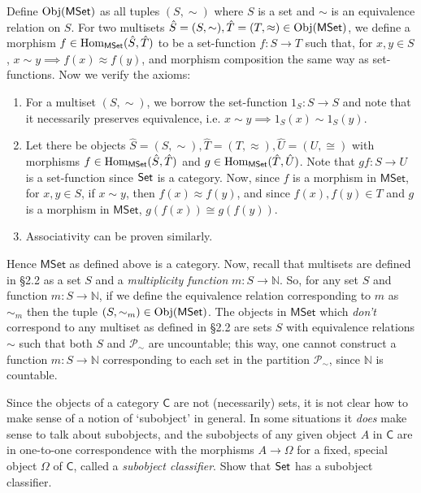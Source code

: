 \begin{solution}
	Define $\mathrm{Obj}(\mathsf{MSet})$ as all tuples $(S, \sim)$ where $S$ is a set and $\sim$ is
	an equivalence relation on $S$. For two multisets $\hat{S} = (S,\sim), \hat{T} =
	(T,\approx) \in \mathrm{Obj}(\mathsf{MSet})$, we define a morphism
	$f\in\mathrm{Hom}_{\mathsf{MSet}}(\hat{S},\hat{T})$ to be a set-function $f:S\to T$ such that, for
	$x,y\in S$, $x\sim y\implies f(x)\approx f(y)$, and morphism composition the
	same way as set-functions. Now we verify the axioms:
	
	\begin{enumerate}
		\item For a multiset $(S,\sim)$, we borrow the set-function $1_S:S\to S$ and
		note that it necessarily preserves equivalence, i.e. $x\sim y\implies 1_S(x)\sim
		1_S(y)$.
		\item Let there be objects $\hat{S}=(S,\sim), \hat{T}=(T,\approx),
		\hat{U}=(U,\cong)$ with morphisms $f\in\mathrm{Hom}_{\mathsf{MSet}}(\hat{S},\hat{T})$ and
		$g\in\mathrm{Hom}_{\mathsf{MSet}}(\hat{T},\hat{U})$. Note that $gf:S\to U$ is a set-function since
		$\mathsf{Set}$ is a category. Now, since $f$ is a morphism in ${\mathsf{MSet}}$, for
		$x,y\in S$, if $x\sim y$, then $f(x)\approx f(y)$, and since $f(x),f(y)\in T$
		and $g$ is a morphism in ${\mathsf{MSet}}$, $g(f(x))\cong g(f(y))$.
		\item Associativity can be proven similarly.
	\end{enumerate}
	
	Hence ${\mathsf{MSet}}$ as defined above is a category. Now, recall that multisets are
	defined in \S2.2 as a set $S$ and a \textit{multiplicity function}
	$m:S\to\mathbb{N}$. So, for any set $S$ and function $m:S\to\mathbb{N}$, if we
	define the equivalence relation corresponding to $m$ as $\sim_m$ then the
	tuple $(S,\sim_m)\in\mathrm{Obj}({\mathsf{MSet}})$. The objects in ${\mathsf{MSet}}$ which
	\textit{don't} correspond to any multiset as defined in \S2.2 are sets $S$ with
	equivalence relations $\sim$ such that both $S$ and $\mathscr{P}_\sim$ are
	uncountable; this way, one cannot construct a function $m:S\to\mathbb{N}$
	corresponding to each set in the partition $\mathscr{P}_\sim$, since
	$\mathbb{N}$ is countable.
\end{solution}


\begin{problem}[3.10]
	Since the objects of a category $\mathsf{C}$ are not (necessarily) sets, it is not clear
	how to make sense of a notion of `subobject' in general. In some situations it
	\textit{does} make sense to talk about subobjects, and the subobjects of any
	given object $A$ in $\mathsf{C}$ are in one-to-one correspondence with the morphisms
	$A\to\Omega$ for a fixed, special object $\Omega$ of $\mathsf{C}$, called a
	\textit{subobject classifier}. Show that $\mathsf{Set}$ has a subobject classifier.
\end{problem}

